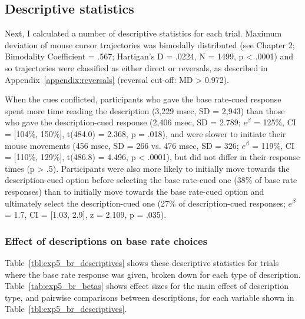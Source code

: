 
\subsection{Descriptive statistics}

Next, I calculated a number of descriptive statistics for each trial.
Maximum deviation of mouse cursor trajectories was bimodally distributed
(see Chapter 2; Bimodality Coefficient = .567; Hartigan's D = .0224, N = 1499, p < .0001)
and so trajectories were classified as either direct or reversals,
as described in Appendix~\ref{appendix:reversals} (reversal cut-off: MD > 0.972).

When the cues conflicted,
participants who gave the base rate-cued response
spent more time reading the description (3,229 msec, SD = 2,943)
than those who gave the description-cued response
(2,406 msec, SD = 2.789;
$e^{\beta}$ = 125\%, CI = [104\%, 150\%],
t(484.0) = 2.368, p = .018),
and were slower to initiate their mouse movements
(456 msec, SD = 266 vs. 476 msec, SD = 326;
$e^{\beta}$ = 119\%, CI = [110\%, 129\%],
t(486.8) = 4.496, p < .0001),
but did not differ in their response times (p > .5).
Participants were also more likely to
initially move towards the description-cued option
before selecting the base rate-cued one
(38\% of base rate responses)
than to initially move towards the base rate-cued option
and ultimately select the description-cued one
(27\% of description-cued responses;
$e^{\beta}$ = 1.7, CI = [1.03, 2.9],
z = 2.109, p = .035).

\subsubsection{Effect of descriptions on base rate choices}

Table~\ref{tbl:exp5_br_descriptives} shows these descriptive statistics
for trials where the  base rate response was given,
broken down for each type of description.
Table~\ref{tab:exp5_br_betas} shows effect sizes for
the main effect of description type, and pairwise comparisons between descriptions,
for each variable shown in Table~\ref{tbl:exp5_br_descriptives}.

